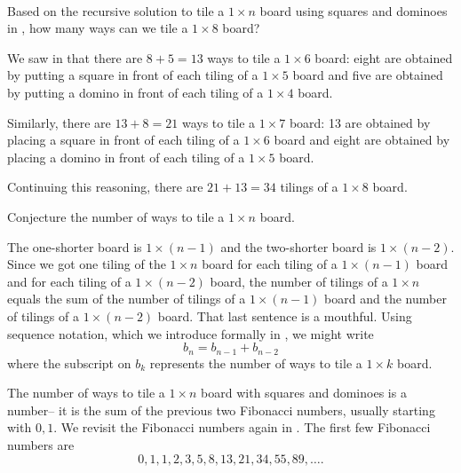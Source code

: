 \begin{exam}
\label{exam_sq_dom8} 
~
    \begin{actpart}
        \item Based on the recursive solution to tile a $1 \times n$ board using squares and dominoes in , how many ways can we tile a $1 \times 8$ board?
            \begin{soln}
                We saw in  that there are $8+5=13$ ways to tile a $1 \times 6$ board: eight are obtained by putting a square in front of each tiling of a $1 \times 5$ board and five are obtained by putting a domino in front of each tiling of a $1 \times 4$ board.  

                Similarly, there are $13+8=21$ ways to tile a $1 \times 7$ board: 13 are obtained by placing a square in front of each tiling of a $1 \times 6$ board and eight are obtained by placing a domino in front of each tiling of a $1 \times 5$ board.

                Continuing this reasoning, there are $21+13 = 34$ tilings of a $1 \times 8$ board.
            \end{soln}
        \item Conjecture the number of ways to tile a $1 \times n$ board.
            \begin{soln}
                The one-shorter board is $1 \times (n-1)$ and the two-shorter board is $1 \times (n-2)$. Since we got one tiling of the $1 \times n$ board for each tiling of a $1 \times (n-1)$ board and for each tiling of a $1 \times (n-2)$ board, the number of tilings of a $1 \times n$ equals the sum of the number of tilings of a $1 \times (n-1)$ board and the number of tilings of a $1 \times (n-2)$ board. That last sentence is a mouthful.  Using sequence notation, which we introduce formally in , we might write
                  $$b_n=b_{n-1}+b_{n-2}$$
                where the subscript on $b_k$ represents the number of ways to tile a $1 \times k$ board.
            \end{soln}
    \end{actpart}
\end{exam}

The number of ways to tile a $1 \times n$ board with squares and dominoes is a  number-- it is the sum of the previous two Fibonacci numbers, usually starting with $0,1$.  We revisit the Fibonacci numbers again in .  The first few Fibonacci numbers are
$$0,1,1,2,3,5,8,13,21,34,55,89,\ldots.$$

